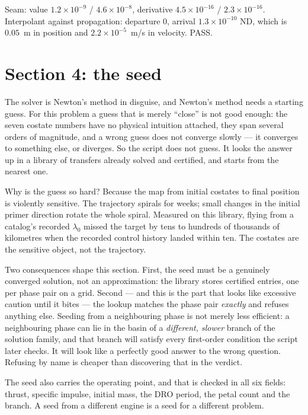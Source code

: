 \documentclass[11pt]{article}
\begin{document}
\begin{ran}
Seam: value $1.2\times10^{-9}$ / $4.6\times10^{-8}$, derivative
$4.5\times10^{-16}$ / $2.3\times10^{-16}$. Interpolant against propagation:
departure $0$, arrival $1.3\times10^{-10}$ ND, which is $0.05$~m in position
and $2.2\times10^{-5}$~m/s in velocity. PASS.
\end{ran}

\section{Section 4: the seed}\label{sec:sec4}

\begin{eli}
The solver is Newton's method in disguise, and Newton's method needs a starting
guess. For this problem a guess that is merely ``close'' is not good enough: the
seven costate numbers have no physical intuition attached, they span several
orders of magnitude, and a wrong guess does not converge slowly --- it
converges to something else, or diverges. So the script does not guess. It
looks the answer up in a library of transfers already solved and certified, and
starts from the nearest one.
\end{eli}

\begin{intu}
Why is the guess so hard? Because the map from initial costates to final
position is violently sensitive. The trajectory spirals for weeks; small
changes in the initial primer direction rotate the whole spiral. Measured on
this library, flying from a catalog's recorded $\lambda_0$ missed the target by
tens to hundreds of thousands of kilometres when the recorded control history
landed within ten. The costates are the sensitive object, not the trajectory.

Two consequences shape this section. First, the seed must be a genuinely
converged solution, not an approximation: the library stores certified
entries, one per phase pair on a grid. Second --- and this is the part that
looks like excessive caution until it bites --- the lookup matches the phase
pair \emph{exactly} and refuses anything else. Seeding from a neighbouring
phase is not merely less efficient: a neighbouring phase can lie in the basin
of a \emph{different, slower} branch of the solution family, and that branch
will satisfy every first-order condition the script later checks. It will look
like a perfectly good answer to the wrong question. Refusing by name is
cheaper than discovering that in the verdict.

The seed also carries the operating point, and that is checked in all six
fields: thrust, specific impulse, initial mass, the DRO period, the petal count
and the branch. A seed from a different engine is a seed for a different
problem.
\end{intu}
\end{document}
